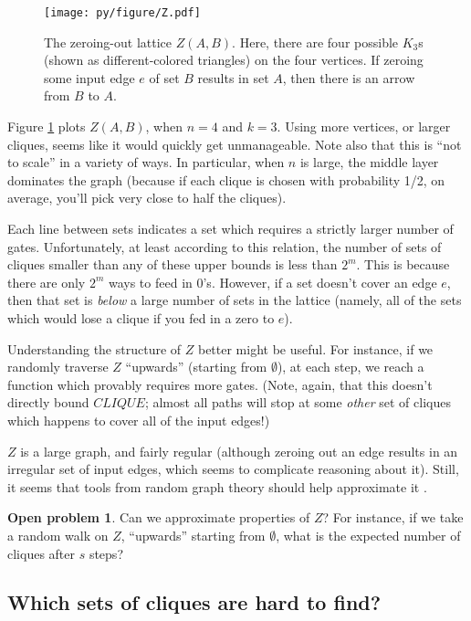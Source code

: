 \documentclass[12pt]{article}
\theoremstyle{definition}
\newtheorem{prob}{Open problem}[section]
\begin{document}
\begin{figure}
\centering
\texttt{[image: py/figure/Z.pdf]}
\caption{The zeroing-out lattice $Z(A,B).$
Here, there are four possible $K_3$s
(shown as different-colored triangles) on the four vertices.
If zeroing some input edge $e$ of set $B$ results in set $A$, then
there is an arrow from $B$ to $A$.
}

\label{fig:Z}
\end{figure}

Figure \ref{fig:Z} plots $Z(A,B)$, when $n=4$ and $k=3$.
Using more vertices, or
larger cliques, seems like it would quickly get unmanageable.
Note also that this is ``not to scale'' in a variety of ways. In
particular, when $n$ is large, the middle layer dominates the graph
(because if each clique is chosen with probability 1/2, on average,
you'll pick very close to half the cliques).

Each line between sets indicates a set which requires a strictly larger
number of gates.  Unfortunately, at least according to this relation,
the number of sets of cliques smaller than
any of these upper bounds is less than $2^m$. This is because
there are only $2^m$ ways to feed in 0's.
 However, if a set doesn't cover an edge $e$,
then that set is {\em below} a large number of sets in the lattice (namely,
all of the sets which would lose a clique if you fed in a zero to $e$).

Understanding the structure of $Z$ better might be useful.
For instance, if we randomly traverse $Z$ ``upwards'' (starting from $\emptyset$),
at each step, we reach a function which provably requires more gates. (Note,
again, that this doesn't directly bound $CLIQUE$; almost all paths will stop
at some {\em other} set of cliques which happens to cover all of the input edges!)

$Z$ is a large graph, and fairly regular (although zeroing out an edge results
in an irregular set of input edges, which seems to complicate reasoning about it).
Still, it seems that tools from
random graph theory should help approximate it \cite{bollobas1976cliques}.

\begin{prob} \label{edgeZonkingApprox}
Can we approximate properties of $Z$? For instance, if we take a random walk
on $Z$, ``upwards'' starting from $\emptyset$,
what is the expected number of cliques after $s$ steps?
\end{prob}

\subsection{Which sets of cliques are hard to find?}
\label{sec:whichCliques}
\end{document}
